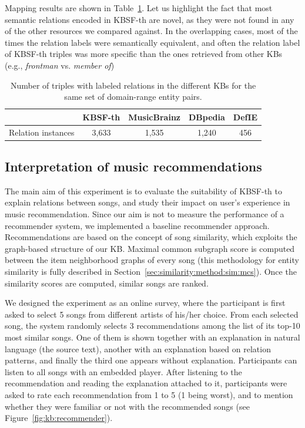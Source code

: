 Mapping results are shown in Table~\ref{tbl:kb:coverage}. Let us highlight the fact that most semantic relations encoded in \textsc{KBSF}-th are novel, as they were not found in any of the other resources we compared against. In the overlapping cases, most of the times the relation labels were semantically equivalent, and often the relation label of \textsc{KBSF}-th triples was more specific than the ones retrieved from other KBs (e.g., \textit{frontman} vs. \textit{member of})

\begin{table}[]
\centering
	\begin{tabular}{ c c c c c }
	\hline
	& KBSF-th & MusicBrainz & DBpedia & DefIE \\
	\hline
	Relation instances & 3,633 & 1,535 & 1,240 & 456 \\
	\hline
	\end{tabular}
	\caption[Number of triples with labeled relations in the different KBs.]{Number of triples with labeled relations in the different KBs for the same set of domain-range entity pairs.}
	\label{tbl:kb:coverage}
\end{table}


\subsection{Interpretation of music recommendations}
\label{sec:kb:experiments:recommendation}

The main aim of this experiment is to evaluate the suitability of \textsc{KBSF}-th to explain relations between songs, and study their impact on user's experience in music recommendation. 
Since our aim is not to measure the performance of a recommender system, we implemented a baseline recommender approach. Recommendations are based on the concept of song similarity, which exploits the graph-based structure of our KB. Maximal common subgraph score is computed between the item neighborhood graphs of every song (this methodology for entity similarity is fully described in Section~\ref{sec:similarity:method:sim:mcs}). Once the similarity scores are computed, similar songs are ranked.


We designed the experiment as an online survey, where the participant is first asked to select 5 songs from different artists of his/her choice. From each selected song, the system randomly selects 3 recommendations among the list of its top-10 most similar songs. One of them is shown together with an explanation in natural language (the source text), another with an explanation based on relation patterns, and finally the third one appears without explanation.
Participants can listen to all songs with an embedded player. After listening to the recommendation and reading the explanation attached to it, participants were asked to rate each recommendation from 1 to 5 (1 being worst), and to mention whether they were familiar or not with the recommended songs (see Figure~\ref{fig:kb:recommender}).



